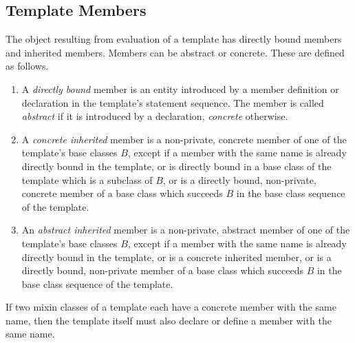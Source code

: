 \documentclass[a4paper,12pt,twoside,titlepage]{book}
\newcommand{\ifqualified}[1]{}
\begin{document}
\subsection{Template Members}

\label{sec:members}

The object resulting from evaluation of a template has directly bound
members and inherited members. Members can be abstract or concrete.
These are defined as follows.
\begin{enumerate}
\item
A {\em directly bound} member is an entity introduced by a member
definition or declaration in the template's statement sequence. The
member is called {\em abstract} if it is introduced by a declaration,
{\em concrete} otherwise.
\item
A {\em concrete inherited} member is a non-private, concrete member of
one of the template's base classes $B$, except if a member with the
same \ifqualified{qualified} name is already directly bound in the template, or is
directly bound in a base class of the template which is a subclass of
$B$, or is a directly bound, non-private, concrete member of a base
class which succeeds $B$ in the base class sequence of the template.
\item
An {\em abstract inherited} member is a non-private, abstract member
of one of the template's base classes $B$, except if a member with the
same \ifqualified{qualified} name is already directly bound in the template, or is a
concrete inherited member, or is a directly bound, non-private member
of a base class which succeeds $B$ in the base class sequence of the
template.
\end{enumerate}

If two mixin classes of a template each have a concrete member
with the same name, then the template itself must also declare or
define a member with the same name.
\end{document}
